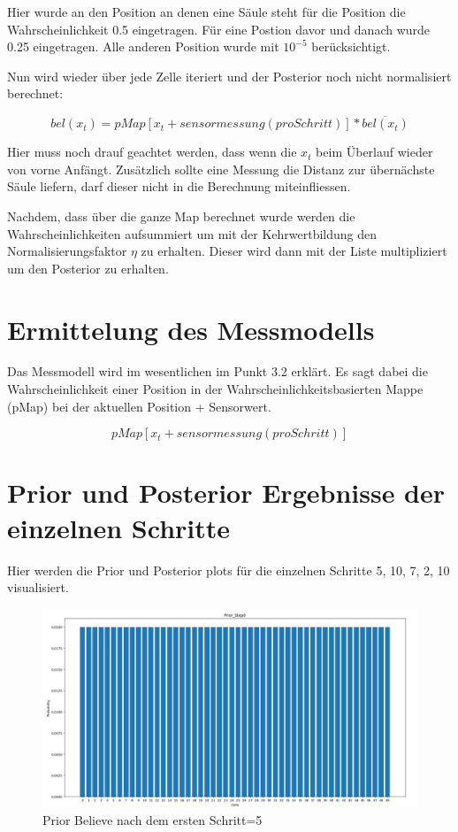 \documentclass[12pt]{article}
\begin{document}
Hier wurde an den Position an denen eine Säule steht für die Position die Wahrscheinlichkeit 0.5 eingetragen. Für eine Postion davor und danach wurde 0.25 eingetragen. Alle anderen Position wurde mit $10^{-5}$ berücksichtigt.

Nun wird wieder über jede Zelle iteriert und der Posterior noch nicht normalisiert berechnet:

$$bel(x_t) = pMap[x_t + sensormessung(pro Schritt)] * \overline{bel(x_t)}$$

Hier muss noch drauf geachtet werden, dass wenn die $x_t$ beim Überlauf wieder von vorne Anfängt. Zusätzlich sollte eine Messung die Distanz zur übernächste Säule liefern, darf dieser nicht in die Berechnung miteinfliessen.

Nachdem, dass über die ganze Map berechnet wurde werden die Wahrscheinlichkeiten aufsummiert um mit der Kehrwertbildung den Normalisierungsfaktor $\eta$ zu erhalten. Dieser wird dann mit der Liste multipliziert um den Posterior zu erhalten.
 

\section{Ermittelung des Messmodells}
Das Messmodell wird im wesentlichen im Punkt 3.2 erklärt.
Es sagt dabei die Wahrscheinlichkeit einer Position in der Wahrscheinlichkeitsbasierten Mappe (pMap) bei der aktuellen Position + Sensorwert.

$$pMap[x_t + sensormessung(pro Schritt)]$$

\section{Prior und Posterior Ergebnisse der einzelnen Schritte}
Hier werden die Prior und Posterior plots für die einzelnen Schritte 5, 10, 7, 2, 10 visualisiert.


\begin{figure}[h]
    \centering
    \includegraphics[width=1.3\textwidth]{img/prior_step_0.png}
    \caption{Prior Believe nach dem ersten Schritt=5}
    \label{fig:Prior Believe nach dem ersten Schritt=5}
\end{figure}
\end{document}
